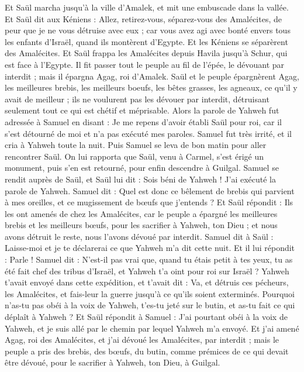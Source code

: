 \begin{multicols}{2}
Et Saül marcha jusqu'à la ville d'Amalek, et mit une embuscade dans la vallée.
Et Saül dit aux Kéniens : Allez, retirez-vous, séparez-vous des Amalécites, de peur que je ne vous détruise avec eux ; car vous avez agi avec bonté envers tous les enfants d'Israël, quand ils montèrent d'Egypte. Et les Kéniens se séparèrent des Amalécites.
Et Saül frappa les Amalécites depuis Havila jusqu'à Schur, qui est face à l'Egypte.
Il fit passer tout le peuple au fil de l'épée, le dévouant par interdit ; mais il épargna Agag, roi d'Amalek.
Saül et le peuple épargnèrent Agag, les meilleures brebis, les meilleurs boeufs, les bêtes grasses, les agneaux, ce qu'il y avait de meilleur ; ils ne voulurent pas les dévouer par interdit, détruisant seulement tout ce qui est chétif et méprisable.
Alors la parole de Yahweh fut adressée à Samuel en disant :
Je me repens d'avoir établi Saül pour roi, car il s'est détourné de moi et n'a pas exécuté mes paroles. Samuel fut très irrité, et il cria à Yahweh toute la nuit.
Puis Samuel se leva de bon matin pour aller rencontrer Saül. On lui rapporta que Saül, venu à Carmel, s'est érigé un monument, puis s'en est retourné, pour enfin descendre à Guilgal.
Samuel se rendit auprès de Saül, et Saül lui dit : Sois béni de Yahweh ! J'ai exécuté la parole de Yahweh.
Samuel dit : Quel est donc ce bêlement de brebis qui parvient à mes oreilles, et ce mugissement de bœufs que j'entends ?
Et Saül répondit : Ils les ont amenés de chez les Amalécites, car le peuple a épargné les meilleures brebis et les meilleurs bœufs, pour les sacrifier à Yahweh, ton Dieu ; et nous avons détruit le reste, nous l'avons dévoué par interdit.
Samuel dit à Saül : Laisse-moi et je te déclarerai ce que Yahweh m'a dit cette nuit. Et il lui répondit : Parle !
Samuel dit : N'est-il pas vrai que, quand tu étais petit à tes yeux, tu as été fait chef des tribus d'Israël, et Yahweh t'a oint pour roi sur Israël ?
Yahweh t'avait envoyé dans cette expédition, et t'avait dit : Va, et détruis ces pécheurs, les Amalécites, et fais-leur la guerre jusqu'à ce qu'ils soient exterminés.
Pourquoi n'as-tu pas obéi à la voix de Yahweh, t'es-tu jeté sur le butin, et as-tu fait ce qui déplaît à Yahweh ?
Et Saül répondit à Samuel : J'ai pourtant obéi à la voix de Yahweh, et je suis allé par le chemin par lequel Yahweh m'a envoyé. Et j'ai amené Agag, roi des Amalécites, et j'ai dévoué les Amalécites, par interdit ;
mais le peuple a pris des brebis, des bœufs, du butin, comme prémices de ce qui devait être dévoué, pour le sacrifier à Yahweh, ton Dieu, à Guilgal.

\end{multicols}
